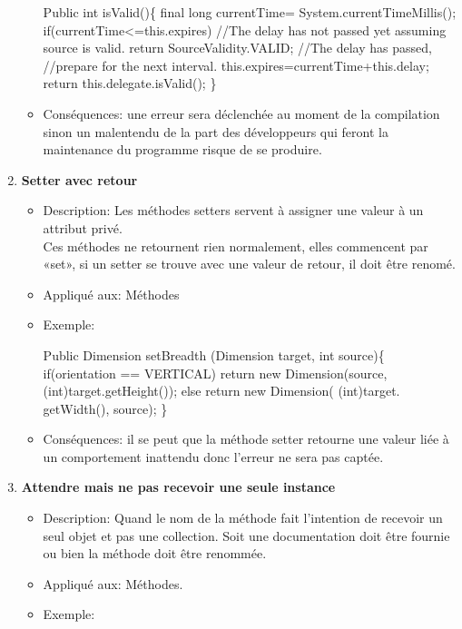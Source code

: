 \begin{enumerate}
\begin{itemize}
\begin{framed}
{\selectfont
Public int isValid()\{
final long currentTime=
System.currentTimeMillis();
if(currentTime<=this.expires){
//The delay has not passed yet assuming source is valid.
return SourceValidity.VALID;
}
\newline
//The delay has passed,
\newline
//prepare for the next interval.
this.expires=currentTime+this.delay;
return this.delegate.isValid();
\}
}
\end{framed}
\item Conséquences: une erreur sera déclenchée au moment de la compilation sinon un malentendu de la part des développeurs qui feront la maintenance du programme risque de se produire.
\end{itemize}

\item \textbf{Setter avec retour}
\begin{itemize}

\item Description: Les méthodes setters servent à assigner une valeur à un attribut privé.\\
Ces méthodes ne retournent rien normalement, elles commencent par «set», si un setter se trouve avec une valeur de retour, il doit être renomé.
\item Appliqué aux: Méthodes
\item Exemple: 
\begin{framed}
{\selectfont

Public Dimension setBreadth\newline
(Dimension target, int source)\{\newline
if(orientation == VERTICAL)\newline
return new Dimension(source,\newline
(int)target.getHeight());\newline
else\newline
return new Dimension(\newline
(int)target. getWidth(), source);\newline
\}
}
\end{framed}
\item Conséquences: il se peut que la méthode setter retourne une valeur liée à un comportement inattendu donc l’erreur ne sera pas captée.

\end{itemize}

\item \textbf{Attendre mais ne pas recevoir une seule instance}
\begin{itemize}
\item Description: Quand le nom de la méthode fait l’intention de recevoir un seul objet et pas une collection.
Soit une documentation doit être fournie ou bien la méthode doit être renommée.
\item Appliqué aux: Méthodes.
\item Exemple: 
\begin{framed}


\end{framed}
\end{itemize}
\end{enumerate}
